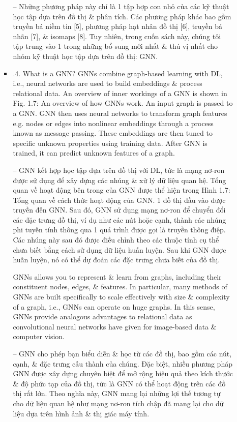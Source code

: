 \documentclass{article}
\begin{document}
\begin{itemize}
\begin{itemize}
\begin{itemize}
            -- Những phương pháp này chỉ là 1 tập hợp con nhỏ của các kỹ thuật học tập dựa trên đồ thị \& phân tích. Các phương pháp khác bao gồm truyền bá niềm tin [5], phương pháp hạt nhân đồ thị [6], truyền bá nhãn [7], \& isomaps [8]. Tuy nhiên, trong cuốn sách này, chúng tôi tập trung vào 1 trong những bổ sung mới nhất \& thú vị nhất cho nhóm kỹ thuật học tập dựa trên đồ thị: GNN.
            \item {.4. What is a GNN?} GNNs combine graph-based learning with DL, i.e., neural networks are used to build embeddings \& process relational data. An overview of inner workings of a GNN is shown in {\sf Fig. 1.7: An overview of how GNNs work. An input graph is passed to a GNN. GNN then uses neural networks to transform graph features e.g. nodes or edges into nonlinear embeddings through a process known as message passing. These embeddings are then tuned to specific unknown properties using training data. After GNN is trained, it can predict unknown features of a graph.}

            -- GNN kết hợp học tập dựa trên đồ thị với DL, tức là mạng nơ-ron được sử dụng để xây dựng các nhúng \& xử lý dữ liệu quan hệ. Tổng quan về hoạt động bên trong của GNN được thể hiện trong {\sf Hình 1.7: Tổng quan về cách thức hoạt động của GNN. 1 đồ thị đầu vào được truyền đến GNN. Sau đó, GNN sử dụng mạng nơ-ron để chuyển đổi các đặc trưng đồ thị, ví dụ như các nút hoặc cạnh, thành các nhúng phi tuyến tính thông qua 1 quá trình được gọi là truyền thông điệp. Các nhúng này sau đó được điều chỉnh theo các thuộc tính cụ thể chưa biết bằng cách sử dụng dữ liệu huấn luyện. Sau khi GNN được huấn luyện, nó có thể dự đoán các đặc trưng chưa biết của đồ thị.}

            GNNs allows you to represent \& learn from graphs, including their constituent nodes, edges, \& features. In particular, many methods of GNNs are built specifically to scale effectively with size \& complexity of a graph, i.e., GNNs can operate on huge graphs. In this sense, GNNs provide analogous advantages to relational data as convolutional neural networks have given for image-based data \& computer vision.

            -- GNN cho phép bạn biểu diễn \& học từ các đồ thị, bao gồm các nút, cạnh, \& đặc trưng cấu thành của chúng. Đặc biệt, nhiều phương pháp GNN được xây dựng chuyên biệt để mở rộng hiệu quả theo kích thước \& độ phức tạp của đồ thị, tức là GNN có thể hoạt động trên các đồ thị rất lớn. Theo nghĩa này, GNN mang lại những lợi thế tương tự cho dữ liệu quan hệ như mạng nơ-ron tích chập đã mang lại cho dữ liệu dựa trên hình ảnh \& thị giác máy tính.


\end{itemize}
\end{itemize}
\end{itemize}
\end{document}

